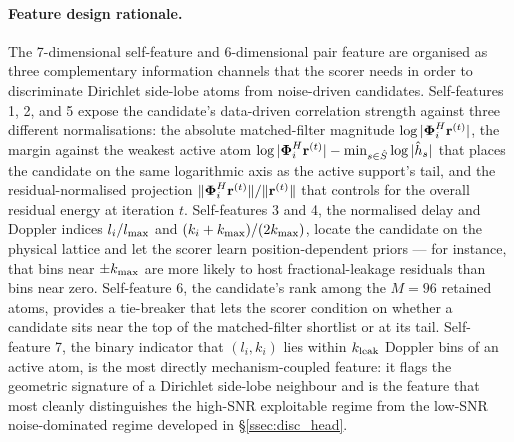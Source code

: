 \paragraph{Feature design rationale.}
The 7-dimensional self-feature and 6-dimensional pair feature are organised as three complementary information channels that the scorer needs in order to discriminate Dirichlet side-lobe atoms from noise-driven candidates. Self-features 1, 2, and 5 expose the candidate's data-driven correlation strength against three different normalisations: the absolute matched-filter magnitude $\log|\boldsymbol{\Phi}_i^H \mathbf{r}^{(t)}|$, the margin against the weakest active atom $\log|\boldsymbol{\Phi}_i^H \mathbf{r}^{(t)}| - \min_{s \in \hat{S}} \log|\hat{h}_s|$ that places the candidate on the same logarithmic axis as the active support's tail, and the residual-normalised projection $\|\boldsymbol{\Phi}_i^H \mathbf{r}^{(t)}\|/\|\mathbf{r}^{(t)}\|$ that controls for the overall residual energy at iteration $t$. Self-features 3 and 4, the normalised delay and Doppler indices $l_i / l_{\max}$ and $(k_i + k_{\max})/(2k_{\max})$, locate the candidate on the physical lattice and let the scorer learn position-dependent priors --- for instance, that bins near $\pm k_{\max}$ are more likely to host fractional-leakage residuals than bins near zero. Self-feature 6, the candidate's rank among the $M = 96$ retained atoms, provides a tie-breaker that lets the scorer condition on whether a candidate sits near the top of the matched-filter shortlist or at its tail. Self-feature 7, the binary indicator that $(l_i, k_i)$ lies within $k_{\mathrm{leak}}$ Doppler bins of an active atom, is the most directly mechanism-coupled feature: it flags the geometric signature of a Dirichlet side-lobe neighbour and is the feature that most cleanly distinguishes the high-SNR exploitable regime from the low-SNR noise-dominated regime developed in \S\ref{ssec:disc_head}.

